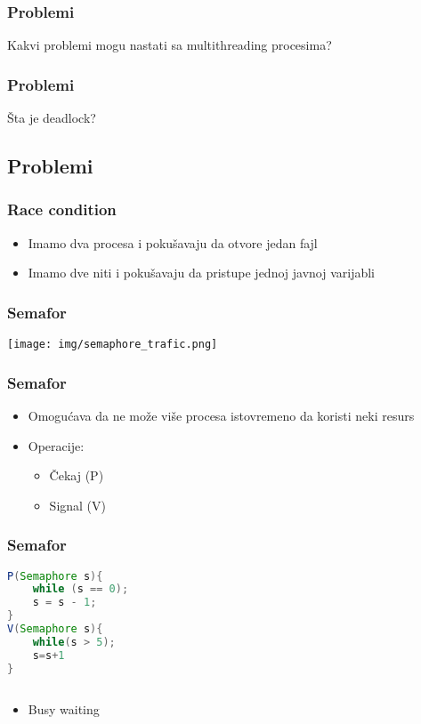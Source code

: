 \documentclass{beamer}
\begin{document}
\begin{frame}
    \frametitle{Problemi}
    \begin{center}
        Kakvi problemi mogu nastati sa multithreading procesima?
    \end{center}
\end{frame}

\begin{frame}
    \frametitle{Problemi}
    \begin{center}
        Šta je deadlock?
    \end{center}
\end{frame}

\subsection*{Problemi}
\begin{frame}
    \frametitle{Race condition}
    \begin{itemize}
        \item Imamo dva procesa i pokušavaju da otvore jedan fajl \newline
        \item Imamo dve niti i pokušavaju da pristupe jednoj javnoj varijabli
    \end{itemize}
\end{frame}

\begin{frame}
    \frametitle{Semafor}
    \begin{center}
        \texttt{[image: img/semaphore\_trafic.png]}
    \end{center}
\end{frame}

\begin{frame}
    \frametitle{Semafor}
    \begin{itemize}
        \item Omogućava da ne može više procesa istovremeno da koristi neki resurs \newline
        \item Operacije: \begin{itemize}
            \item Čekaj (P)
            \item Signal (V)
        \end{itemize}
    \end{itemize}
\end{frame}

\begin{frame}[fragile]
    \frametitle{Semafor}
    \begin{lstlisting}[language=Java]
P(Semaphore s){
    while (s == 0);
    s = s - 1;
}
V(Semaphore s){
    while(s > 5);
    s=s+1
}    
        
    \end{lstlisting}

    \begin{itemize}
        \item Busy waiting
    \end{itemize}
\end{frame}
\end{document}
